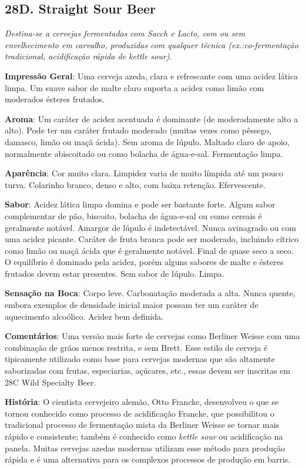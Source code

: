 \subsection*{28D. Straight Sour Beer}
\textit{Destina-se a cervejas fermentadas com Sacch e Lacto, com ou sem envelhecimento em carvalho, produzidas com qualquer técnica (ex.:co-fermentação tradicional, acidificação rápida de kettle sour).}

\textbf{Impressão Geral}: Uma cerveja azeda, clara e refrescante com uma acidez lática limpa. Um suave sabor de malte claro suporta a acidez como limão com moderados ésteres frutados.

\textbf{Aroma}: Um caráter de acidez acentuada é dominante (de moderadamente alto a alto). Pode ter um caráter frutado moderado (muitas vezes como pêssego, damasco, limão ou maçã ácida). Sem aroma de lúpulo. Maltado claro de apoio, normalmente abiscoitado ou como bolacha de água-e-sal. Fermentação limpa.

\textbf{Aparência}: Cor muito clara. Limpidez varia de muito límpida até um pouco turva. Colarinho branco, denso e alto, com baixa retenção. Efervescente.

\textbf{Sabor}: Acidez lática limpa domina e pode ser bastante forte. Algum sabor complementar de pão, biscoito, bolacha de água-e-sal ou como cereais é geralmente notável. Amargor de lúpulo é indetectável. Nunca avinagrado ou com uma acidez picante. Caráter de fruta branca pode ser moderado, incluindo cítrico como limão ou maçã ácida que é geralmente notável. Final de quase seco a seco. O equilíbrio é dominado pela acidez, porém alguns sabores de malte e ésteres frutados devem estar presentes. Sem sabor de lúpulo. Limpa.

\textbf{Sensação na Boca}: Corpo leve. Carbonatação moderada a alta. Nunca quente, embora exemplos de densidade inicial maior possam ter um caráter de aquecimento alcoólico. Acidez bem definida.

\textbf{Comentários}: Uma versão mais forte de cervejas como Berliner Weisse com uma combinação de grãos menos restrita, e sem Brett. Esse estilo de cerveja é tipicamente utilizado como base para cervejas modernas que são altamente saborizadas com frutas, especiarias, açúcares, etc., essas devem ser inscritas em 28C Wild Specialty Beer.

\textbf{História}: O cientista cervejeiro alemão, Otto Francke, desenvolveu o que se tornou conhecido como processo de acidificação Francke, que possibilitou o tradicional processo de fermentação mista da Berliner Weisse se tornar mais rápido e consistente; também é conhecido como \textit{kettle sour} ou acidificação na panela. Muitas cervejas azedas modernas utilizam esse método para produção rápida e é uma alternativa para os complexos processos de produção em barris.

